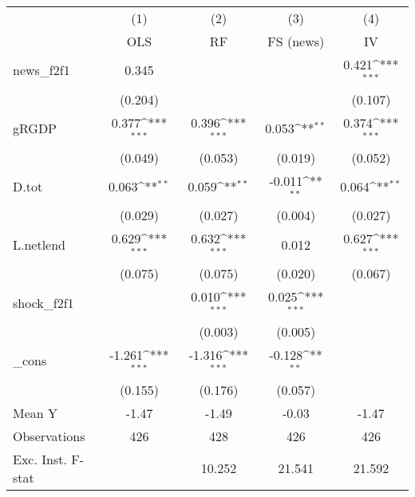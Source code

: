 {
\def\sym#1{\ifmmode^{#1}\else\(^{#1}\)\fi}
\begin{tabular}{l*{4}{c}}
\toprule
            &\multicolumn{1}{c}{(1)}&\multicolumn{1}{c}{(2)}&\multicolumn{1}{c}{(3)}&\multicolumn{1}{c}{(4)}\\
            &\multicolumn{1}{c}{OLS}&\multicolumn{1}{c}{RF}&\multicolumn{1}{c}{FS (news)}&\multicolumn{1}{c}{IV}\\
\midrule
news\_f2f1   &       0.345         &                     &                     &       0.421\sym{***}\\
            &     (0.204)         &                     &                     &     (0.107)         \\
\addlinespace
gRGDP       &       0.377\sym{***}&       0.396\sym{***}&       0.053\sym{**} &       0.374\sym{***}\\
            &     (0.049)         &     (0.053)         &     (0.019)         &     (0.052)         \\
\addlinespace
D.tot       &       0.063\sym{**} &       0.059\sym{**} &      -0.011\sym{**} &       0.064\sym{**} \\
            &     (0.029)         &     (0.027)         &     (0.004)         &     (0.027)         \\
\addlinespace
L.netlend   &       0.629\sym{***}&       0.632\sym{***}&       0.012         &       0.627\sym{***}\\
            &     (0.075)         &     (0.075)         &     (0.020)         &     (0.067)         \\
\addlinespace
shock\_f2f1  &                     &       0.010\sym{***}&       0.025\sym{***}&                     \\
            &                     &     (0.003)         &     (0.005)         &                     \\
\addlinespace
\_cons      &      -1.261\sym{***}&      -1.316\sym{***}&      -0.128\sym{**} &                     \\
            &     (0.155)         &     (0.176)         &     (0.057)         &                     \\
\midrule
Mean Y      &       -1.47         &       -1.49         &       -0.03         &       -1.47         \\
Observations&         426         &         428         &         426         &         426         \\
Exc. Inst. F-stat&                     &      10.252         &      21.541         &      21.592         \\
\bottomrule
\end{tabular}
}
